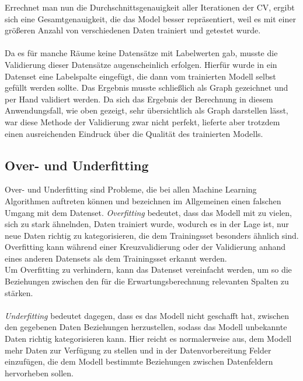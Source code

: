 Errechnet man nun die Durchschnittsgenauigkeit aller Iterationen der CV, ergibt sich eine Gesamtgenauigkeit, 
die das Model besser repräsentiert, weil es mit einer größeren Anzahl von verschiedenen Daten trainiert und 
getestet wurde.
\\\\
Da es für manche Räume keine Datensätze mit Labelwerten gab, musste die Validierung dieser Datensätze 
augenscheinlich erfolgen. Hierfür wurde in ein Datenset eine Labelspalte eingefügt, die dann vom trainierten
Modell selbst gefüllt werden sollte. Das Ergebnis musste schließlich als Graph gezeichnet und per Hand validiert 
werden. Da sich das Ergebnis der Berechnung in diesem Anwendungsfall, wie oben gezeigt, sehr übersichtlich als 
Graph darstellen lässt, war diese Methode der Validierung zwar nicht perfekt, lieferte aber trotzdem einen 
ausreichenden Eindruck über die Qualität des trainierten Modells.


\subsection{Over- und Underfitting}
Over- und Underfitting sind Probleme, die bei allen Machine Learning Algorithmen auftreten können und bezeichnen 
im Allgemeinen einen falschen Umgang mit dem Datenset.
\textit{Overfitting} bedeutet, dass das Modell mit zu vielen, sich zu stark ähnelnden, Daten trainiert wurde, 
wodurch es in der Lage ist, nur neue Daten richtig zu kategorisieren, die dem Trainingsset besonders ähnlich sind.
Overfitting kann während einer Kreuzvalidierung oder der Validierung anhand eines anderen Datensets als dem 
Trainingsset erkannt werden.\\
Um Overfitting zu verhindern, kann das Datenset vereinfacht werden, um so die Beziehungen zwischen den
für die Erwartungsberechnung relevanten Spalten zu stärken.\\\\
\textit{Underfitting} bedeutet dagegen, dass es das Modell nicht geschafft hat, zwischen den gegebenen Daten
Beziehungen herzustellen, sodass das Modell unbekannte Daten richtig kategorisieren kann. Hier reicht es 
normalerweise aus, dem Modell mehr Daten zur Verfügung zu stellen und in der Datenvorbereitung Felder 
einzufügen, die dem Modell bestimmte Beziehungen zwischen Datenfeldern hervorheben sollen. 

